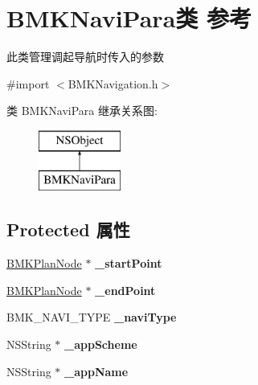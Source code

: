 \hypertarget{interface_b_m_k_navi_para}{}\section{B\+M\+K\+Navi\+Para类 参考}
\label{interface_b_m_k_navi_para}


此类管理调起导航时传入的参数  




{\ttfamily \#import $<$B\+M\+K\+Navigation.\+h$>$}

类 B\+M\+K\+Navi\+Para 继承关系图\+:\begin{figure}[H]
\begin{center}
\leavevmode
\includegraphics[height=2.000000cm]{interface_b_m_k_navi_para}
\end{center}
\end{figure}
\subsection*{Protected 属性}
\begin{DoxyCompactItemize}
\item 
\hypertarget{interface_b_m_k_navi_para_a61606b6d503536494dc88ca0f5c4a10a}{}\hyperlink{interface_b_m_k_plan_node}{B\+M\+K\+Plan\+Node} $\ast$ {\bfseries \+\_\+start\+Point}\label{interface_b_m_k_navi_para_a61606b6d503536494dc88ca0f5c4a10a}

\item 
\hypertarget{interface_b_m_k_navi_para_a4683a7844800c847ac279b643561f6ba}{}\hyperlink{interface_b_m_k_plan_node}{B\+M\+K\+Plan\+Node} $\ast$ {\bfseries \+\_\+end\+Point}\label{interface_b_m_k_navi_para_a4683a7844800c847ac279b643561f6ba}

\item 
\hypertarget{interface_b_m_k_navi_para_ab0dfd815bdc737dd794913d2389a4f0b}{}B\+M\+K\+\_\+\+N\+A\+V\+I\+\_\+\+T\+Y\+P\+E {\bfseries \+\_\+navi\+Type}\label{interface_b_m_k_navi_para_ab0dfd815bdc737dd794913d2389a4f0b}

\item 
\hypertarget{interface_b_m_k_navi_para_a506fe6a30001c88f3d0e1fcbc4e2754d}{}N\+S\+String $\ast$ {\bfseries \+\_\+app\+Scheme}\label{interface_b_m_k_navi_para_a506fe6a30001c88f3d0e1fcbc4e2754d}

\item 
\hypertarget{interface_b_m_k_navi_para_af5f38d4e1125aa660f65abd04b222438}{}N\+S\+String $\ast$ {\bfseries \+\_\+app\+Name}\label{interface_b_m_k_navi_para_af5f38d4e1125aa660f65abd04b222438}

\end{DoxyCompactItemize}
